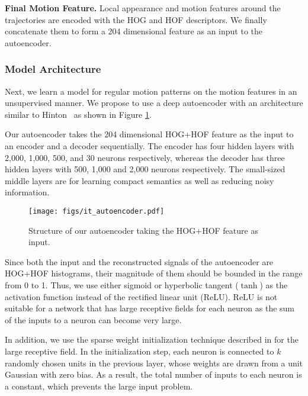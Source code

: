 \documentclass[10pt,twocolumn,letterpaper]{article}
\begin{document}
\vspace{.5em}
\noindent \textbf{Final Motion Feature.}
Local appearance and motion features around the trajectories are encoded with the HOG and HOF descriptors. 
We finally concatenate them to form a 204 dimensional feature as an input to the autoencoder.





\subsubsection{Model Architecture}

Next, we learn a model for regular motion patterns on the motion features in an unsupervised manner. 
We propose to use a deep autoencoder with an architecture similar to Hinton\etal~ \cite{hinton2006reducing} as shown in Figure \ref{fig:it_auto}. 

Our autoencoder takes the 204 dimensional HOG+HOF feature as the input to an encoder and a decoder sequentially. 
The encoder has four hidden layers with 2,000, 1,000, 500, and 30 neurons respectively, whereas the decoder has three hidden layers with 500, 1,000 and 2,000 neurons respectively.
The small-sized middle layers are for learning compact semantics as well as reducing noisy information.

\begin{figure}[h]
	\centering
	\texttt{[image: figs/it\_autoencoder.pdf]}
	\caption{Structure of our autoencoder taking the HOG+HOF feature as input.}
	\vspace{-2mm}
	\label{fig:it_auto}
\end{figure}

Since both the input and the reconstructed signals of the autoencoder are HOG+HOF histograms, their magnitude of them should be bounded in the range from 0 to 1. 
Thus, we use either sigmoid or hyperbolic tangent ($\tanh$) as the activation function instead of the rectified linear unit (ReLU). ReLU is not suitable for a network that has large receptive fields for each neuron as the sum of the inputs to a neuron can become very large.

In addition, we use the sparse weight initialization technique described in \cite{sutskever2013importance} for the large receptive field. 
In the initialization step, each neuron is connected to $k$ randomly chosen units in the previous layer, whose weights are drawn from a unit Gaussian with zero bias.
As a result, the total number of inputs to each neuron is a constant, which prevents the large input problem.
\end{document}
